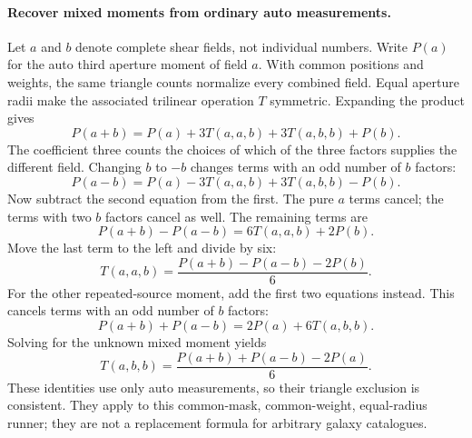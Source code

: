 \documentclass[11pt]{article}
\begin{document}
\paragraph{Recover mixed moments from ordinary auto measurements.}
Let $a$ and $b$ denote complete shear fields, not individual numbers. Write
$P(a)$ for the auto third aperture moment of field $a$. With common
positions and weights, the same triangle counts normalize every combined
field. Equal aperture radii make the associated trilinear operation $T$
symmetric. Expanding the product gives
\begin{equation}
 P(a+b)=P(a)+3T(a,a,b)+3T(a,b,b)+P(b).
\end{equation}
The coefficient three counts the choices of which of the three factors
supplies the different field. Changing $b$ to $-b$ changes terms with an
odd number of $b$ factors:
\begin{equation}
 P(a-b)=P(a)-3T(a,a,b)+3T(a,b,b)-P(b).
\end{equation}
Now subtract the second equation from the first. The pure $a$ terms cancel;
the terms with two $b$ factors cancel as well. The remaining terms are
\begin{equation}
 P(a+b)-P(a-b)=6T(a,a,b)+2P(b).
\end{equation}
Move the last term to the left and divide by six:
\begin{equation}
 T(a,a,b)=\frac{P(a+b)-P(a-b)-2P(b)}{6}.
\end{equation}
For the other repeated-source moment, add the first two equations instead.
This cancels terms with an odd number of $b$ factors:
\begin{equation}
 P(a+b)+P(a-b)=2P(a)+6T(a,b,b).
\end{equation}
Solving for the unknown mixed moment yields
\begin{equation}
 T(a,b,b)=\frac{P(a+b)+P(a-b)-2P(a)}{6}.
\end{equation}
These identities use only auto measurements, so their triangle exclusion
is consistent. They apply to this common-mask, common-weight, equal-radius
runner; they are not a replacement formula for arbitrary galaxy catalogues.
\end{document}
